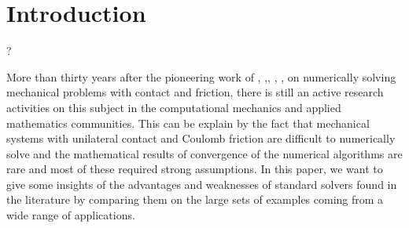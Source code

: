 
\section{Introduction}

\citet{Panagiotopoulos_IA1975} ?

More than thirty years after the pioneering work of \cite{Necas.ea1980}, \cite{Haslinger1983,Haslinger1984},\cite{Katona_IJNAMG1983}, \cite{Chaudhary.Bathe_CS1986}, \cite{Jean.Moreau1987}, \cite{Mitsopoulou.Doudoumis1988} on numerically solving mechanical problems with contact and friction, there is still an active research activities on this subject in the computational mechanics and applied mathematics communities.  This can be explain by the fact that  mechanical systems with unilateral contact and Coulomb friction are difficult to numerically solve and the mathematical results of convergence of the numerical algorithms are rare and most of these required strong assumptions. In this paper, we want to give some insights of the advantages and weaknesses of standard solvers found in the literature by comparing them on the large sets of examples coming from a wide range of applications.

